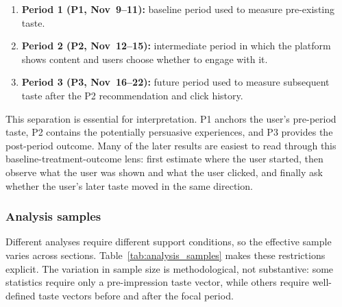 \documentclass[11pt]{article}
\begin{document}
\begin{enumerate}[leftmargin=1.5em, itemsep=0.2em, topsep=0.25em]
    \item \textbf{Period 1 (P1, Nov~9--11):} baseline period used to measure pre-existing taste.
    \item \textbf{Period 2 (P2, Nov~12--15):} intermediate period in which the platform shows content and users choose whether to engage with it.
    \item \textbf{Period 3 (P3, Nov~16--22):} future period used to measure subsequent taste after the P2 recommendation and click history.
\end{enumerate}

This separation is essential for interpretation. P1 anchors the user's pre-period taste, P2 contains the potentially persuasive experiences, and P3 provides the post-period outcome. Many of the later results are easiest to read through this baseline-treatment-outcome lens: first estimate where the user started, then observe what the user was shown and what the user clicked, and finally ask whether the user's later taste moved in the same direction.

\subsubsection{Analysis samples}

Different analyses require different support conditions, so the effective sample varies across sections. Table~\ref{tab:analysis_samples} makes these restrictions explicit. The variation in sample size is methodological, not substantive: some statistics require only a pre-impression taste vector, while others require well-defined taste vectors before and after the focal period.
\end{document}
